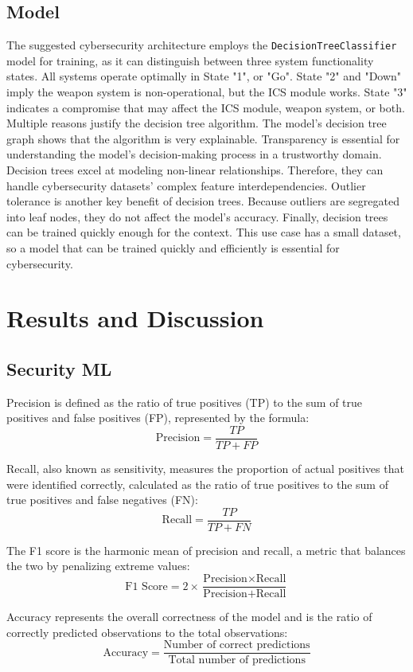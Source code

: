 \documentclass[conference]{IEEEtran}
\begin{document}
\subsection{Model}
The suggested cybersecurity architecture employs the \texttt{DecisionTreeClassifier} model for training, as it can distinguish between three system functionality states. All systems operate optimally in State "1", or "Go". State "2" and "Down" imply the weapon system is non-operational, but the ICS module works. State "3" indicates a compromise that may affect the ICS module, weapon system, or both.
Multiple reasons justify the decision tree algorithm. The model's decision tree graph shows that the algorithm is very explainable. Transparency is essential for understanding the model's decision-making process in a trustworthy domain. Decision trees excel at modeling non-linear relationships. Therefore, they can handle cybersecurity datasets' complex feature interdependencies.
Outlier tolerance is another key benefit of decision trees. Because outliers are segregated into leaf nodes, they do not affect the model's accuracy. Finally, decision trees can be trained quickly enough for the context. This use case has a small dataset, so a model that can be trained quickly and efficiently is essential for cybersecurity.


\section{Results and Discussion}

\subsection{Security ML}

Precision is defined as the ratio of true positives (TP) to the sum of true positives and false positives (FP), represented by the formula:
\[
\text{Precision} = \frac{TP}{TP + FP}
\]

Recall, also known as sensitivity, measures the proportion of actual positives that were identified correctly, calculated as the ratio of true positives to the sum of true positives and false negatives (FN):
\[
\text{Recall} = \frac{TP}{TP + FN}
\]

The F1 score is the harmonic mean of precision and recall, a metric that balances the two by penalizing extreme values:
\[
\text{F1 Score} = 2 \times \frac{\text{Precision} \times \text{Recall}}{\text{Precision} + \text{Recall}}
\]

Accuracy represents the overall correctness of the model and is the ratio of correctly predicted observations to the total observations:
\[
\text{Accuracy} = \frac{\text{Number of correct predictions}}{\text{Total number of predictions}}
\]
\end{document}
